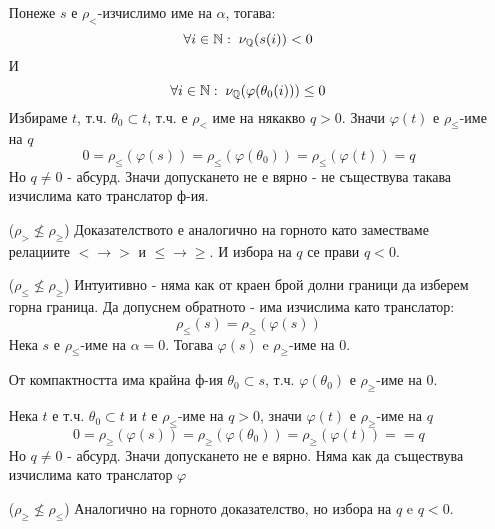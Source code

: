 \begin{solution}
\begin{itemize}
            Понеже $s$ е $\rho_<$-изчислимо име на $\alpha$, тогава:
            \begin{equation}
                \forall i \in {\mathbb{N}}:\; \nu_{\mathbb{Q}}(s(i)) < 0
            \end{equation}
            И
            \begin{equation}
                \forall i \in {\mathbb{N}}:\; \nu_{\mathbb{Q}}(\varphi(\theta_0(i))) \leq 0
            \end{equation}
            Избираме $t$, т.ч. $\theta_0 \subset t$, т.ч. е $\rho_<$ име на някакво $q > 0$. Значи $\varphi(t)$ е $\rho_\leq$-име на $q$
            \begin{equation}
                0 = \rho_\leq(\varphi(s)) = \rho_\leq(\varphi(\theta_0)) = \rho_\leq(\varphi(t)) = q
            \end{equation}
            Но $q \neq 0$ - абсурд. Значи допускането не е вярно - не съществува такава изчислима като транслатор ф-ия.

        \item[($\rho_> \not\leq \rho_\geq$)] Доказателството е аналогично на горното като заместваме релациите $< \to >$ и $\leq \to \geq$. И избора на $q$ се прави $q < 0$.
        \item[($\rho_\leq \not\leq \rho_\geq$)] Интуитивно - няма как от краен брой долни граници да изберем горна граница. Да допуснем обратното - има изчислима като транслатор:
            \begin{equation}
                \rho_\leq(s) = \rho_\geq(\varphi(s))
            \end{equation}
            Нека $s$ е $\rho_\leq$-име на $\alpha=0$. Тогава $\varphi(s)$ e $\rho_\geq$-име на 0.

            От компактността има крайна ф-ия $\theta_0 \subset s$, т.ч. $\varphi(\theta_0)$ е $\rho_\geq$-име на 0.

            Нека $t$ е т.ч. $\theta_0 \subset t$ и $t$ е $\rho_\leq$-име на $q > 0$, значи $\varphi(t)$ е $\rho_\geq$-име на $q$
            \begin{equation}
                0 = \rho_\geq(\varphi(s)) = \rho_\geq(\varphi(\theta_0)) = \rho_\geq(\varphi(t)) = = q
            \end{equation}
            Но $q \neq 0$ - абсурд. Значи допускането не е вярно. Няма как да съществува изчислима като транслатор $\varphi$

        \item[($\rho_\geq \not\leq \rho_\leq$)] Аналогично на горното доказателство, но избора на $q$ e $q < 0$.
    \end{itemize}
\end{solution}
